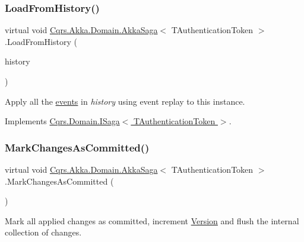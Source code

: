 \subsubsection{\texorpdfstring{Load\+From\+History()}{LoadFromHistory()}}
{\footnotesize\ttfamily virtual void \hyperlink{classCqrs_1_1Akka_1_1Domain_1_1AkkaSaga}{Cqrs.\+Akka.\+Domain.\+Akka\+Saga}$<$ T\+Authentication\+Token $>$.Load\+From\+History (\begin{DoxyParamCaption}\item[{I\+Enumerable$<$ \hyperlink{interfaceCqrs_1_1Events_1_1ISagaEvent}{I\+Saga\+Event}$<$ T\+Authentication\+Token $>$$>$}]{history }\end{DoxyParamCaption})\hspace{0.3cm}{\ttfamily [virtual]}}



Apply all the \hyperlink{}{events} in {\itshape history}  using event replay to this instance. 



Implements \hyperlink{interfaceCqrs_1_1Domain_1_1ISaga_a2714804684bc65cf4dec79b4697b9b21_a2714804684bc65cf4dec79b4697b9b21}{Cqrs.\+Domain.\+I\+Saga$<$ T\+Authentication\+Token $>$}.

\mbox{\label{classCqrs_1_1Akka_1_1Domain_1_1AkkaSaga_a83269fac4653cca097461e924feaea7f_a83269fac4653cca097461e924feaea7f}} 
\subsubsection{\texorpdfstring{Mark\+Changes\+As\+Committed()}{MarkChangesAsCommitted()}}
{\footnotesize\ttfamily virtual void \hyperlink{classCqrs_1_1Akka_1_1Domain_1_1AkkaSaga}{Cqrs.\+Akka.\+Domain.\+Akka\+Saga}$<$ T\+Authentication\+Token $>$.Mark\+Changes\+As\+Committed (\begin{DoxyParamCaption}{ }\end{DoxyParamCaption})\hspace{0.3cm}{\ttfamily [virtual]}}



Mark all applied changes as committed, increment \hyperlink{classCqrs_1_1Akka_1_1Domain_1_1AkkaSaga_a3fda31a3857e12a1aed60f4a4f04edd1_a3fda31a3857e12a1aed60f4a4f04edd1}{Version} and flush the internal collection of changes. 



